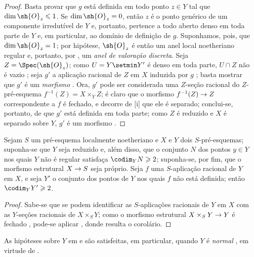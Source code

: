 \documentclass[oneside,10pt]{amsart}
\makeatletter
\renewcommand{\leq}{\leqslant}
\renewcommand{\geq}{\geqslant}
\newcommand{\ega@arrow}[2]{\mathchoice{#1}{#2}{#2}{#2}}
\renewcommand{\to}{\ega@arrow{\longrightarrow}{\rightarrow}}
\let\EGAOriginalLabel\label
\renewcommand{\label}[1]{\phantomsection\EGAOriginalLabel{#1}}
\makeatother
\begin{document}
\begin{proof}
Basta provar que $g$ está definida em todo ponto $z\in Y$ tal que $\dim\sh{O}_z\leq1$.
Se $\dim\sh{O}_z=0$, então $z$ é o ponto genérico de um componente irredutível de $Y$  e, portanto, pertence a todo aberto denso em toda parte de $Y$ e, em particular, ao domínio de definição de $g$.
Suponhamos, pois, que $\dim\sh{O}_z=1$; por hipótese, $\sh{O}_z$ é então um anel local noetheriano regular e, portanto, por , um \emph{anel de valoração discreta}.
Seja $Z=\Spec(\sh{O}_z)$;
como $U=Y\setmin Y'$ é denso em toda parte, $U\cap Z$ não é vazio ;
seja $g'$ a aplicação racional de $Z$ em $X$ induzida por $g$ ;
basta mostrar que $g'$ é um \emph{morfismo} .
Ora, $g'$ pode ser considerada uma $Z$-seção racional do $Z$-pré-esquema $f^{-1}(Z)=X\times_Y Z$;
é claro que o morfismo $f^{-1}(Z)\to Z$ correspondente a $f$ é fechado, e decorre de [i] que ele é separado;
conclui-se, portanto, de  que $g'$ está definida em toda parte;
como $Z$ é reduzido e $X$ é separado sobre $Y$, $g'$ é um morfismo .
\end{proof}

\begin{corollary}[7.3.6]
\label{II.7.3.6}
Sejam $S$ um pré-esquema localmente noetheriano e $X$ e $Y$ dois $S$-pré-esquemas;
suponha-se que $Y$ seja reduzido e, além disso, que o conjunto $N$ dos pontos $y\in Y$ nos quais $Y$ não é regular satisfaça $\codim_Y N\geq2$;
suponha-se, por fim, que o morfismo estrutural $X\to S$ seja próprio.
Seja $f$ uma $S$-aplicação racional de $Y$ em $X$, e seja $Y'$ o conjunto dos pontos de $Y$ nos quais $f$ não está definida;
então $\codim_Y Y'\geq2$.
\end{corollary}

\begin{proof}
Sabe-se  que se podem identificar as $S$-aplicações racionais de $Y$ em $X$ com as $Y$-seções racionais de $X\times_S Y$;
como o morfismo estrutural $X\times_S Y\to Y$ é fechado , pode-se aplicar , donde resulta o corolário.
\end{proof}

\begin{remark}[7.3.7]
\label{II.7.3.7}
As hipóteses sobre $Y$ em  e  são satisfeitas, em particular, quando $Y$ é \emph{normal} , em virtude de .
\end{remark}
\end{document}
